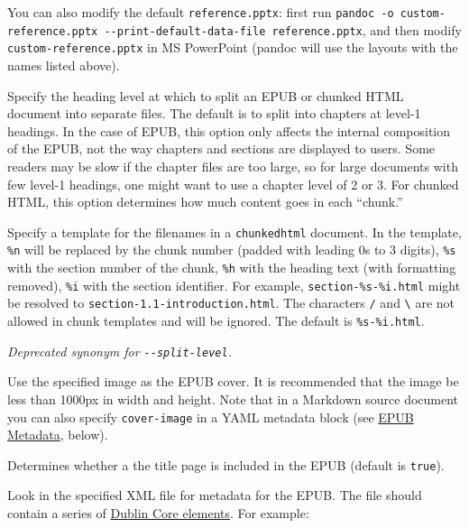 \documentclass[
]{article}
\begin{document}
\begin{description}
\begin{description}
You can also modify the default \texttt{reference.pptx}: first run
\texttt{pandoc\ -o\ custom-reference.pptx\ -\/-print-default-data-file\ reference.pptx},
and then modify \texttt{custom-reference.pptx} in MS PowerPoint (pandoc
will use the layouts with the names listed above).
\end{description}
\item[\texttt{-\/-split-level=}\emph{NUMBER}]
Specify the heading level at which to split an EPUB or chunked HTML
document into separate files. The default is to split into chapters at
level-1 headings. In the case of EPUB, this option only affects the
internal composition of the EPUB, not the way chapters and sections are
displayed to users. Some readers may be slow if the chapter files are
too large, so for large documents with few level-1 headings, one might
want to use a chapter level of 2 or 3. For chunked HTML, this option
determines how much content goes in each ``chunk.''
\item[\texttt{-\/-chunk-template=}\emph{PATHTEMPLATE}]
Specify a template for the filenames in a \texttt{chunkedhtml} document.
In the template, \texttt{\%n} will be replaced by the chunk number
(padded with leading 0s to 3 digits), \texttt{\%s} with the section
number of the chunk, \texttt{\%h} with the heading text (with formatting
removed), \texttt{\%i} with the section identifier. For example,
\texttt{section-\%s-\%i.html} might be resolved to
\texttt{section-1.1-introduction.html}. The characters \texttt{/} and
\texttt{\textbackslash{}} are not allowed in chunk templates and will be
ignored. The default is \texttt{\%s-\%i.html}.
\item[\texttt{-\/-epub-chapter-level=}\emph{NUMBER}]
\emph{Deprecated synonym for \texttt{-\/-split-level}.}
\item[\texttt{-\/-epub-cover-image=}\emph{FILE}]
Use the specified image as the EPUB cover. It is recommended that the
image be less than 1000px in width and height. Note that in a Markdown
source document you can also specify \texttt{cover-image} in a YAML
metadata block (see \protect\hyperlink{epub-metadata}{EPUB Metadata},
below).
\item[\texttt{-\/-epub-title-page=true}\textbar{}\texttt{false}]
Determines whether a the title page is included in the EPUB (default is
\texttt{true}).
\item[\texttt{-\/-epub-metadata=}\emph{FILE}]
Look in the specified XML file for metadata for the EPUB. The file
should contain a series of
\href{https://www.dublincore.org/specifications/dublin-core/dces/}{Dublin
Core elements}. For example:


\end{description}
\end{document}
